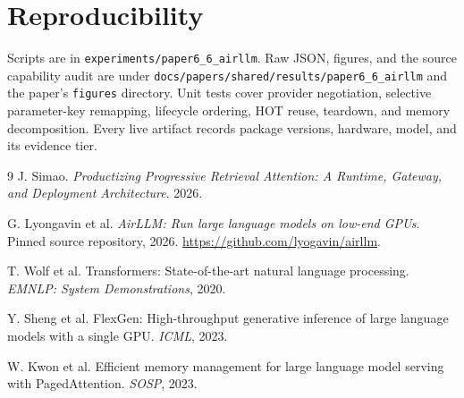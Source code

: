 \documentclass[10pt]{article}
\begin{document}
\section*{Reproducibility}

Scripts are in \texttt{experiments/paper6\_6\_airllm}. Raw JSON, figures, and
the source capability audit are under
\texttt{docs/papers/shared/results/paper6\_6\_airllm} and the paper's
\texttt{figures} directory. Unit tests cover provider negotiation, selective
parameter-key remapping, lifecycle ordering, HOT reuse, teardown, and memory
decomposition. Every live artifact records package versions, hardware, model,
and its evidence tier.

\begin{thebibliography}{9}
\small
{}
J. Simao. \emph{Productizing Progressive Retrieval Attention: A Runtime,
Gateway, and Deployment Architecture}. 2026.

G. Lyongavin et al. \emph{AirLLM: Run large language models on low-end GPUs}.
Pinned source repository, 2026. \url{https://github.com/lyogavin/airllm}.

T. Wolf et al. Transformers: State-of-the-art natural language processing.
\emph{EMNLP: System Demonstrations}, 2020.

Y. Sheng et al. FlexGen: High-throughput generative inference of large language
models with a single GPU. \emph{ICML}, 2023.

W. Kwon et al. Efficient memory management for large language model serving
with PagedAttention. \emph{SOSP}, 2023.
\end{thebibliography}
\end{document}

